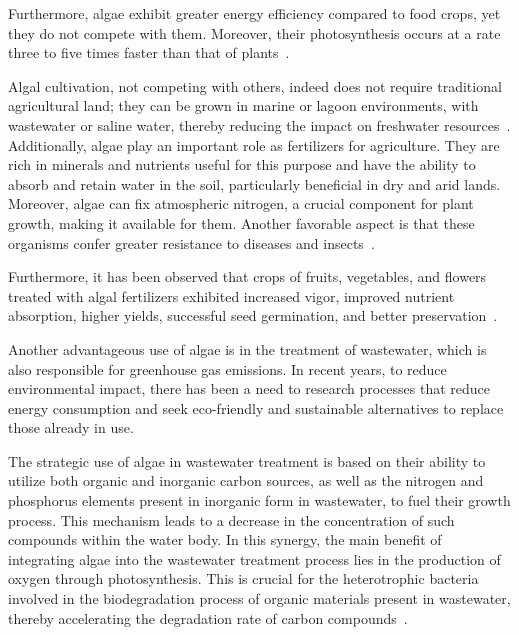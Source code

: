 Furthermore, algae exhibit greater energy efficiency compared to food crops, yet they do not compete with them. Moreover, their photosynthesis occurs at a rate three to five times faster than that of plants~\parencite{salami_AlgaeBased_2021}.

Algal cultivation, not competing with others, indeed does not require traditional agricultural land; they can be grown in marine or lagoon environments, with wastewater or saline water, thereby reducing the impact on freshwater resources~\parencite{narala_Comparison_2016}. Additionally, algae play an important role as fertilizers for agriculture. They are rich in minerals and nutrients useful for this purpose and have the ability to absorb and retain water in the soil, particularly beneficial in dry and arid lands. Moreover, algae can fix atmospheric nitrogen, a crucial component for plant growth, making it available for them. Another favorable aspect is that these organisms confer greater resistance to diseases and insects~\parencite{garima_diverse_2015}.

Furthermore, it has been observed that crops of fruits, vegetables, and flowers treated with algal fertilizers exhibited increased vigor, improved nutrient absorption, higher yields, successful seed germination, and better preservation~\parencite{rupawalla_Algae_2021}.

Another advantageous use of algae is in the treatment of wastewater, which is also responsible for greenhouse gas emissions. In recent years, to reduce environmental impact, there has been a need to research processes that reduce energy consumption and seek eco-friendly and sustainable alternatives to replace those already in use.

The strategic use of algae in wastewater treatment is based on their ability to utilize both organic and inorganic carbon sources, as well as the nitrogen and phosphorus elements present in inorganic form in wastewater, to fuel their growth process. This mechanism leads to a decrease in the concentration of such compounds within the water body. In this synergy, the main benefit of integrating algae into the wastewater treatment process lies in the production of oxygen through photosynthesis. This  is crucial for the heterotrophic bacteria involved in the biodegradation process of organic materials present in wastewater, thereby accelerating the degradation rate of carbon compounds~\parencite{mohsenpour_Integrating_2021}.

